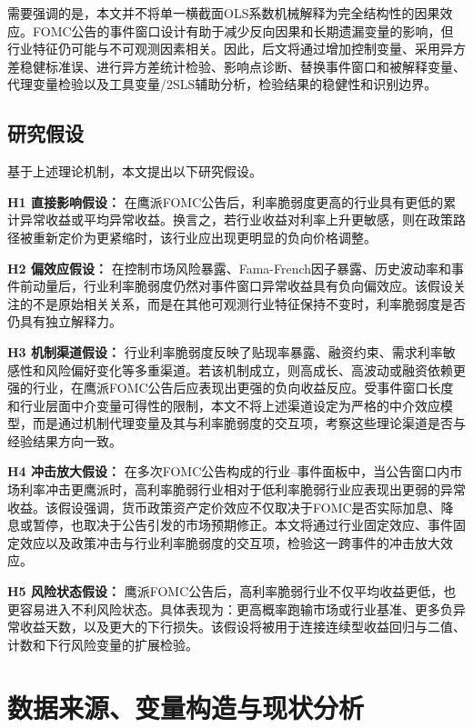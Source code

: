 \documentclass[UTF8,zihao=-4]{ctexart}
\begin{document}
需要强调的是，本文并不将单一横截面OLS系数机械解释为完全结构性的因果效应。FOMC公告的事件窗口设计有助于减少反向因果和长期遗漏变量的影响，但行业特征仍可能与不可观测因素相关。因此，后文将通过增加控制变量、采用异方差稳健标准误、进行异方差统计检验、影响点诊断、替换事件窗口和被解释变量、代理变量检验以及工具变量/2SLS辅助分析，检验结果的稳健性和识别边界。

\subsection{研究假设}

基于上述理论机制，本文提出以下研究假设。

\textbf{H1 直接影响假设：} 在鹰派FOMC公告后，利率脆弱度更高的行业具有更低的累计异常收益或平均异常收益。换言之，若行业收益对利率上升更敏感，则在政策路径被重新定价为更紧缩时，该行业应出现更明显的负向价格调整。

\textbf{H2 偏效应假设：} 在控制市场风险暴露、Fama-French因子暴露、历史波动率和事件前动量后，行业利率脆弱度仍然对事件窗口异常收益具有负向偏效应。该假设关注的不是原始相关关系，而是在其他可观测行业特征保持不变时，利率脆弱度是否仍具有独立解释力。


\textbf{H3 机制渠道假设：} 行业利率脆弱度反映了贴现率暴露、融资约束、需求利率敏感性和风险偏好变化等多重渠道。若该机制成立，则高成长、高波动或融资依赖更强的行业，在鹰派FOMC公告后应表现出更强的负向收益反应。受事件窗口长度和行业层面中介变量可得性的限制，本文不将上述渠道设定为严格的中介效应模型，而是通过机制代理变量及其与利率脆弱度的交互项，考察这些理论渠道是否与经验结果方向一致。


\textbf{H4 冲击放大假设：} 在多次FOMC公告构成的行业--事件面板中，当公告窗口内市场利率冲击更鹰派时，高利率脆弱行业相对于低利率脆弱行业应表现出更弱的异常收益。该假设强调，货币政策资产定价效应不仅取决于FOMC是否实际加息、降息或暂停，也取决于公告引发的市场预期修正。本文将通过行业固定效应、事件固定效应以及政策冲击与行业利率脆弱度的交互项，检验这一跨事件的冲击放大效应。

\textbf{H5 风险状态假设：} 鹰派FOMC公告后，高利率脆弱行业不仅平均收益更低，也更容易进入不利风险状态。具体表现为：更高概率跑输市场或行业基准、更多负异常收益天数，以及更大的下行损失。该假设将被用于连接连续型收益回归与二值、计数和下行风险变量的扩展检验。

\section{数据来源、变量构造与现状分析}
\end{document}
